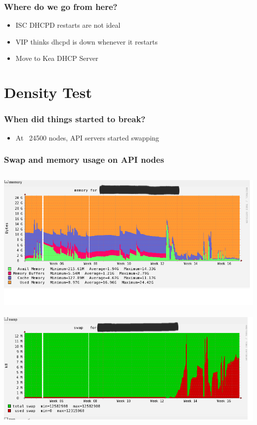 \documentclass[aspectratio=169,11pt,hyperref={colorlinks=true}]{beamer}
\begin{document}
\begin{frame}
    \frametitle{Where do we go from here?}
    \begin{itemize}[<+-| alert@+>]
        \item ISC DHCPD restarts are not ideal
        \item VIP thinks dhcpd is down whenever it restarts
        \item Move to Kea DHCP Server
    \end{itemize}
\end{frame}

\section{Density Test}
\begin{frame}
    \frametitle{When did things started to break?}
    \begin{itemize}
        \item At ~24500 nodes, API servers started swapping
    \end{itemize}
\end{frame}

\begin{frame}
    \frametitle{Swap and memory usage on API nodes}
    \begin{columns}[t]
    \centering
        \includegraphics[scale=0.30]{logos/mem_api.png}\ \includegraphics[scale=0.30]{logos/swap_api.png}
    \end{columns}
\end{frame}
\end{document}
